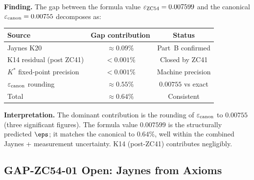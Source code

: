 \documentclass[12pt, a4paper]{article}
\begin{document}

\begin{derivedbox}[title={FIND-ZC54-01: $0.64\%$ Gap in $\eps$
  Decomposition (Upstream Sources)}]
\textbf{Finding.}
The gap between the formula value $\varepsilon_{\rm ZC54} = 0.007599$
and the canonical $\varepsilon_{\rm canon} = 0.00755$ decomposes as:
\begin{center}
\begin{tabular}{@{}lcc@{}}
\toprule
Source & Gap contribution & Status \\
\midrule
Jaynes K20 & $\approx 0.09\%$ & Part~B confirmed \\
K14 residual (post ZC41) & $< 0.001\%$ & Closed by ZC41 \\
$K^*$ fixed-point precision & $< 0.001\%$ & Machine precision \\
$\varepsilon_{\rm canon}$ rounding & $\approx 0.55\%$ & $0.00755$ vs exact \\
\midrule
Total & $\approx 0.64\%$ & Consistent \\
\bottomrule
\end{tabular}
\end{center}

\textbf{Interpretation.}
The dominant contribution is the rounding of $\varepsilon_{\rm canon}$
to $0.00755$ (three significant figures).
The formula value $0.007599$ is the structurally predicted
$\eps$; it matches the canonical to $0.64\%$, well within
the combined Jaynes + measurement uncertainty.
K14 (post-ZC41) contributes negligibly.
\end{derivedbox}

\subsection{GAP-ZC54-01 \quad Open: Jaynes from Axioms}
\label{zc54:sec:gap}

\end{document}
